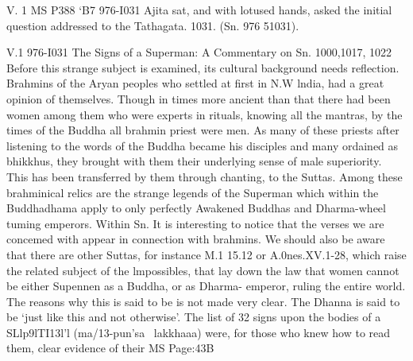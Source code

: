    V. 1
   MS P388 `B7
   976-I031
   Ajita sat, and with lotused hands,
   asked the initial question
   addressed to the Tathagata. 1031.
   (Sn. 976 51031).
   
   
   
   V.1 976-I031
   The Signs of a Superman:
   A Commentary on Sn. 1000,1017, 1022
   Before this strange subject is examined, its cultural background needs
   reﬂection. Brahmins of the Aryan peoples who settled at ﬁrst in N.W lndia, had
   a great opinion of themselves. Though in times more ancient than that there had
   been women among them who were experts in rituals, knowing all the mantras,
   by the times of the Buddha all brahmin priest were men. As many of these
   priests after listening to the words of the Buddha became his disciples and many
   ordained as bhikkhus, they brought with them their underlying sense of male
   superiority. This has been transferred by them through chanting, to the Suttas.
   Among these brahminical relics are the strange legends of the Superman which
   within the Buddhadhama apply to only perfectly Awakened Buddhas and
   Dharma-wheel tuming emperors. Within Sn. It is interesting to notice that the
   verses we are concemed with appear in connection with brahmins. We should
   also be aware that there are other Suttas, for instance M.1 15.12 or
   A.0nes.XV.1-28, which raise the related subject of the lmpossibles, that lay
   down the law that women cannot be either Supennen as a Buddha, or as Dharma-
   emperor, ruling the entire world. The reasons why this is said to be is not made
   very clear. The Dhanna is said to be `just like this and not otherwise'.
   The list of 32 signs upon the bodies of a SLlp9lTI13l'l (ma/13-pun'sa~
   lakkhaaa) were, for those who knew how to read them, clear evidence of their
   MS Page:43B
   
   
   
